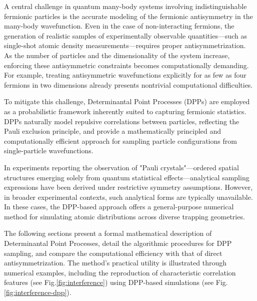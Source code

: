 





A central challenge in quantum many-body systems involving indistinguishable fermionic particles is the accurate modeling of the fermionic antisymmetry in the many-body wavefunction. Even in the case of non-interacting fermions, the generation of realistic samples of experimentally observable quantities—such as single-shot atomic density measurements—requires proper antisymmetrization. As the number of particles and the dimensionality of the system increase, enforcing these antisymmetric constraints becomes computationally demanding. For example, treating antisymmetric wavefunctions explicitly for as few as four fermions in two dimensions already presents nontrivial computational difficulties.

To mitigate this challenge, Determinantal Point Processes (DPPs) are employed as a probabilistic framework inherently suited to capturing fermionic statistics. DPPs naturally model repulsive correlations between particles, reflecting the Pauli exclusion principle, and provide a mathematically principled and computationally efficient approach for sampling particle configurations from single-particle wavefunctions.

In experiments reporting the observation of "Pauli crystals"—ordered spatial structures emerging solely from quantum statistical effects—analytical sampling expressions have been derived under restrictive symmetry assumptions. However, in broader experimental contexts, such analytical forms are typically unavailable. In these cases, the DPP-based approach offers a general-purpose numerical method for simulating atomic distributions across diverse trapping geometries.

The following sections present a formal mathematical description of Determinantal Point Processes, detail the algorithmic procedures for DPP sampling, and compare the computational efficiency with that of direct antisymmetrization. The method’s practical utility is illustrated through numerical examples, including the reproduction of characteristic correlation features (see Fig.\ref{fig:interference}) using DPP-based simulations (see Fig.\ref{fig:interference-dpp}).

